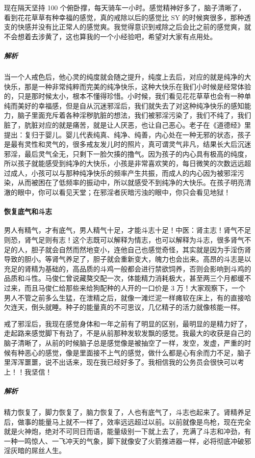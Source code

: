 \begin{case}
    现在隔天坚持 100 个俯卧撑，每天骑车一小时。感觉精神好多了，脑子清晰了，看到花花草草有种幸福的感觉，真的戒除以后的感觉比 SY 的时候爽很多，那种透支的快感并没有比正常人的感觉爽。我觉得意识到戒除之后会比之前的感觉爽，就不会想着去涉黄了，这也算我的一个小经验吧，希望对大家有点用处。
    \subparagraph{解析} 当一个人戒色后，他心灵的纯度就会随之提升，纯度上去后，对应的就是纯净的大快乐，那是一种非常纯粹而完美的纯净快乐，这种大快乐在我们小时候是经常体验的，只是那时候太小，根本不懂得珍惜。小时候，我们看见花花草草也会有一种单纯而美好的幸福感，但是自从沉迷邪淫后，我们就失去了对这种纯净快乐的感知能力，脑子里面充斥着各种淫秽肮脏的想法，我们被邪淫污染了，我们不纯了，我们脏了，肮脏对应的就是痛苦，就是让人厌恶，也让自己恶心。老子在《道德经》里提出：复归于婴儿。婴儿代表纯真、纯净、纯善，内心处在一种无邪的状态，孩子是最有灵性和灵气的，很多戒友发儿时的照片，真可谓灵气非凡，结果长大后沉迷邪淫，最后灵气全无，只剩下一脸欠揍的撸气。因为孩子的内心具有极高的纯度，所以孩子就能感受到纯净的大快乐，小孩是非常喜欢笑的，每日微笑的次数远远超过成人，小孩可以与那种纯净快乐的频率产生共振，而成人的内心因为被邪淫污染，从而被困在了低频率的振动中，所以就感受不到纯净的大快乐。在孩子明亮清澈的眼中，你可以看见天堂；在邪淫者灰暗污浊的眼中，你只会看见地狱！
\end{case}

\paragraph{恢复底气和斗志}

男人有精气，才有底气，男人精气十足，才能斗志十足！中医：肾主志！肾气不足则恐，肾气足则有志！这个志既可以解释为情志，也可以解释为斗志，很多肾气不足的人，胆子就会自然而然地变小，连他自己也感觉奇怪，其实就是因为手淫伤肾导致的胆小。等肾气养足了，胆子就会重新变大，魄力也会出来。高昂的斗志是以充足的肾精为基础的，高品质的斗鸡一般都会进行禁欲饲养，否则会影响到斗鸡的品质和斗性。马俊仁曾说藏獒交配一次，体能精力消耗极大，甚至两三个月都缓不过来，而且马俊仁给那些来给狗配种的人开的一口价是 3 万！大家观察下，一个男人不管之前多么生猛，在泄精之后，就像一滩烂泥一样瘫软在床上，有的直接哈欠连天，倒头就睡。种子的能量真的不可思议，几亿精子的活力就像核能一样。

\begin{case}
    戒了邪淫后，我现在感觉身体和一年之前有了明显的区别，最明显的是精力好了，走起路来感觉脚下有劲了，不是从前那种发软发飘的感觉。我最大的收获是自己的脑子清晰了，从前的时候脑子总是感觉像是被抽空了一样，发空，发虚，严重的时候有种恶心的感觉，像是里面接不上气的感觉，做什么都是心有余而力不足，脑子里浑浑噩噩，说不出话来，现在我已经好多了。我相信我的公务员会很快可以考上！！我坚信！
    \subparagraph{解析} 精力恢复了，脚力恢复了，脑力恢复了，人也有底气了，斗志也起来了。肾精养足后，做事的能量马上就不一样了，效率远远超过以前。以前就像是鸟枪，现在完全就是火神炮，绝对不可同日而语，能量级别一下就上去了，充满了斗志和冲劲，有一种一鸣惊人、一飞冲天的气象，脚下就像安了火箭推进器一样，必将彻底冲破邪淫灰暗的屌丝人生。
\end{case}

